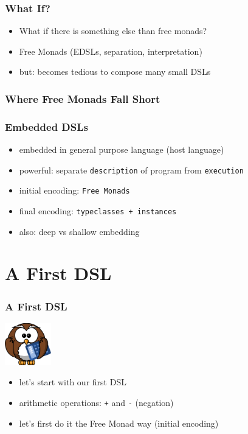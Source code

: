 \documentclass{beamer}
\begin{document}
\begin{frame}
  \frametitle{What If?}
  \begin{itemize}
  \item What if there is something else than free monads?
  \item Free Monads (EDSLs, separation, interpretation)
  \item but: becomes tedious to compose many small DSLs
  \end{itemize}
\end{frame}

\begin{frame}
  \frametitle{Where Free Monads Fall Short}
\end{frame}

\begin{frame}
  \frametitle{Embedded DSLs}
  \begin{itemize}
  \item embedded in general purpose language (host language)
  \item powerful: separate \texttt{description} of program from
    \texttt{execution}
  \item initial encoding: \texttt{Free Monads}
  \item final encoding: \texttt{typeclasses + instances}
  \item also: deep vs shallow embedding
  \end{itemize}
\end{frame}

\section{A First DSL}

\begin{frame}
  \frametitle{A First DSL}
  \begin{center}
    \includegraphics[width=2cm]{../pics/owl.png}
  \end{center}
  \begin{itemize}
  \item let's start with our first DSL
  \item arithmetic operations: \texttt{+} and \texttt{-} (negation)
  \item let's first do it the Free Monad way (initial encoding)
  \end{itemize}
\end{frame}
\end{document}
